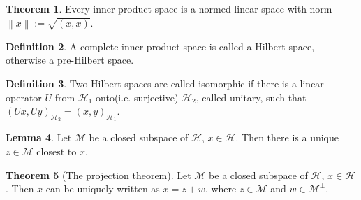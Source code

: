 \documentclass[twocolumn]{article}
\theoremstyle{definition}
\newtheorem{definition}{Definition}[section]
\newtheorem{theorem}[definition]{Theorem}
\newtheorem{lemma}[definition]{Lemma}
\theoremstyle{remark}
\begin{document}
\begin{theorem}
    Every inner product space is a normed linear space with norm $\left\lVert x \right\rVert := \sqrt{(x, x)}$.
\end{theorem}
\begin{definition}
    A complete inner product space is called a Hilbert space, otherwise a pre-Hilbert space.
\end{definition}
\begin{definition}
    Two Hilbert spaces are called isomorphic if there is a linear operator $U$ from $\mathcal{H}_1$ onto(i.e. surjective) $\mathcal{H}_2$, called unitary, such that
    $(Ux, Uy)_{\mathcal{H}_2} = (x, y)_{\mathcal{H}_1}$.
\end{definition}
\begin{lemma}
    Let $\mathcal{M}$ be a closed subspace of $\mathcal{H}$, $x \in \mathcal{H}$.
    Then there is a unique $z \in \mathcal{M}$ closest to $x$.
\end{lemma}
\begin{theorem}[The projection theorem]
    Let $\mathcal{M}$ be a closed subspace of $\mathcal{H}$, $x \in \mathcal{H}$.
    Then $x$ can be uniquely written as $x = z + w$, where $z \in \mathcal{M}$ and $w \in \mathcal{M}^\perp$.
\end{theorem}
\end{document}
